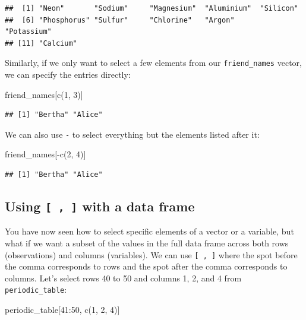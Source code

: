 \documentclass[]{tufte-book}
\newenvironment{Shaded}{\begin{snugshade}}{\end{snugshade}}
\newcommand{\DecValTok}[1]{\textcolor[rgb]{0.00,0.00,0.81}{#1}}
\newcommand{\FunctionTok}[1]{\textcolor[rgb]{0.00,0.00,0.00}{#1}}
\newcommand{\NormalTok}[1]{#1}
\newcommand{\SpecialCharTok}[1]{\textcolor[rgb]{0.00,0.00,0.00}{#1}}
\begin{document}
\begin{verbatim}
##  [1] "Neon"       "Sodium"     "Magnesium"  "Aluminium"  "Silicon"   
##  [6] "Phosphorus" "Sulfur"     "Chlorine"   "Argon"      "Potassium" 
## [11] "Calcium"
\end{verbatim}

Similarly, if we only want to select a few elements from our \texttt{friend\_names} vector, we can specify the entries directly:

\begin{Shaded}
\begin{Highlighting}[]
\NormalTok{friend\_names[}\FunctionTok{c}\NormalTok{(}\DecValTok{1}\NormalTok{, }\DecValTok{3}\NormalTok{)]}
\end{Highlighting}
\end{Shaded}

\begin{verbatim}
## [1] "Bertha" "Alice"
\end{verbatim}

We can also use \texttt{-} to select everything but the elements listed after it:

\begin{Shaded}
\begin{Highlighting}[]
\NormalTok{friend\_names[}\SpecialCharTok{{-}}\FunctionTok{c}\NormalTok{(}\DecValTok{2}\NormalTok{, }\DecValTok{4}\NormalTok{)]}
\end{Highlighting}
\end{Shaded}

\begin{verbatim}
## [1] "Bertha" "Alice"
\end{verbatim}

\hypertarget{using-with-a-data-frame}{%
\subsection{\texorpdfstring{Using \texttt{{[}\ ,\ {]}} with a data frame}{Using {[} , {]} with a data frame}}\label{using-with-a-data-frame}}

You have now seen how to select specific elements of a vector or a variable, but what if we want a subset of the values in the full data frame across both rows (observations) and columns (variables). We can use \texttt{{[}\ ,\ {]}} where the spot before the comma corresponds to rows and the spot after the comma corresponds to columns. Let's select rows 40 to 50 and columns 1, 2, and 4 from \texttt{periodic\_table}:

\begin{Shaded}
\begin{Highlighting}[]
\NormalTok{periodic\_table[}\DecValTok{41}\SpecialCharTok{:}\DecValTok{50}\NormalTok{, }\FunctionTok{c}\NormalTok{(}\DecValTok{1}\NormalTok{, }\DecValTok{2}\NormalTok{, }\DecValTok{4}\NormalTok{)]}
\end{Highlighting}
\end{Shaded}
\end{document}

